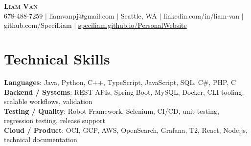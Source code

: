 \documentclass[letterpaper,11pt]{article}
\begin{document}

%
\begin{center}
    \textbf{\Huge \scshape Liam Van} \\ \vspace{1pt}
    \small 678-488-7259 $|$ \small {liamvanpj@gmail.com} $|$ Seattle, WA
 {{$|$ linkedin.com/in/liam-van} {$|$ github.com/SpeciLiam} {$|$ \href{https://speciliam.github.io/PersonalWebsite}{speciliam.github.io/PersonalWebsite}}}

\end{center}

\section{Technical Skills}
 \begin{itemize}[leftmargin=0.15in, label={}]
    \small{\item{
     \textbf{Languages}{: Java, Python, C++, TypeScript, JavaScript, SQL, C\#, PHP, C} \\
     \textbf{Backend / Systems}{: REST APIs, Spring Boot, MySQL, Docker, CLI tooling, scalable workflows, validation} \\
     \textbf{Testing / Quality}{: Robot Framework, Selenium, CI/CD, unit testing, regression testing, release support} \\
     \textbf{Cloud / Product}{: OCI, GCP, AWS, OpenSearch, Grafana, T2, React, Node.js, technical documentation} \\
    }}
 \end{itemize}
%
\end{document}

